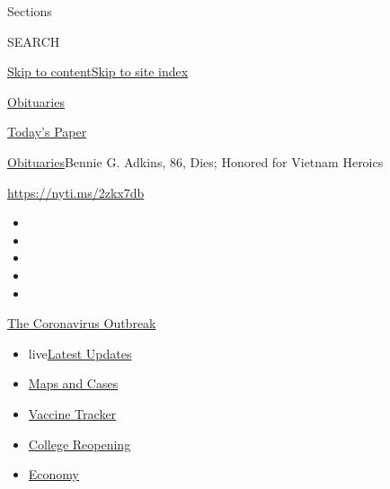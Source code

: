Sections

SEARCH

\protect\hyperlink{site-content}{Skip to
content}\protect\hyperlink{site-index}{Skip to site index}

\href{https://www.nytimes.com/section/obituaries}{Obituaries}

\href{https://myaccount.nytimes.com/auth/login?response_type=cookie\&client_id=vi}{}

\href{https://www.nytimes.com/section/todayspaper}{Today's Paper}

\href{/section/obituaries}{Obituaries}\textbar{}Bennie G. Adkins, 86,
Dies; Honored for Vietnam Heroics

\url{https://nyti.ms/2zkx7db}

\begin{itemize}
\item
\item
\item
\item
\item
\end{itemize}

\href{https://www.nytimes.com/news-event/coronavirus?action=click\&pgtype=Article\&state=default\&region=TOP_BANNER\&context=storylines_menu}{The
Coronavirus Outbreak}

\begin{itemize}
\tightlist
\item
  live\href{https://www.nytimes.com/2020/08/03/world/coronavirus-covid-19.html?action=click\&pgtype=Article\&state=default\&region=TOP_BANNER\&context=storylines_menu}{Latest
  Updates}
\item
  \href{https://www.nytimes.com/interactive/2020/us/coronavirus-us-cases.html?action=click\&pgtype=Article\&state=default\&region=TOP_BANNER\&context=storylines_menu}{Maps
  and Cases}
\item
  \href{https://www.nytimes.com/interactive/2020/science/coronavirus-vaccine-tracker.html?action=click\&pgtype=Article\&state=default\&region=TOP_BANNER\&context=storylines_menu}{Vaccine
  Tracker}
\item
  \href{https://www.nytimes.com/2020/08/02/us/covid-college-reopening.html?action=click\&pgtype=Article\&state=default\&region=TOP_BANNER\&context=storylines_menu}{College
  Reopening}
\item
  \href{https://www.nytimes.com/live/2020/08/03/business/stock-market-today-coronavirus?action=click\&pgtype=Article\&state=default\&region=TOP_BANNER\&context=storylines_menu}{Economy}
\end{itemize}

